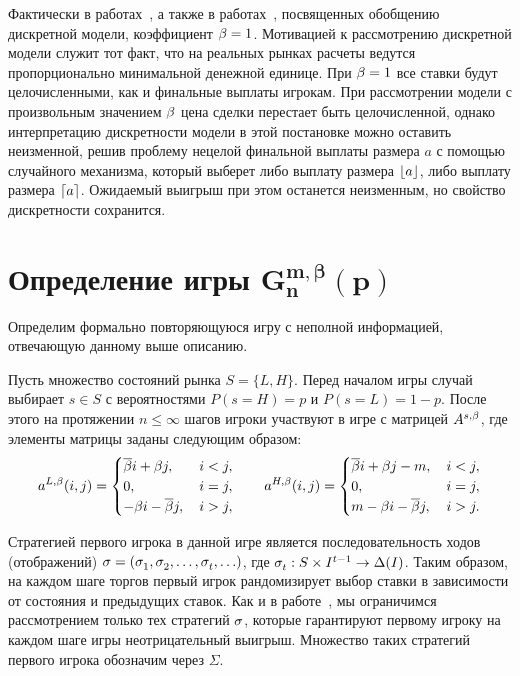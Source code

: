 {Фактически в работах~\cite{domansky07, demeyer05}, а также в работах~\cite{domansky11, domansky13, domansky14}, посвященных обобщению дискретной модели, коэффициент $\beta = 1$.
Мотивацией к рассмотрению дискретной модели служит тот факт, что на реальных рынках расчеты ведутся пропорционально минимальной денежной единице.
При $\beta = 1$ все ставки будут целочисленными, как и финальные выплаты игрокам.
При рассмотрении модели с произвольным значением $\beta$ цена сделки перестает быть целочисленной, однако интерпретацию дискретности модели в этой постановке можно оставить неизменной, решив проблему нецелой финальной выплаты размера $a$ с помощью случайного механизма, который выберет либо выплату размера $\lfloor a \rfloor$, либо выплату размера $\lceil a \rceil$.
Ожидаемый выигрыш при этом останется неизменным, но свойство дискретности сохранится.

\section{Определение игры $\mathbf{G^{m,\beta}_n(p)}$}\label{ch1:formal-def}

Определим формально повторяющуюся игру с неполной информацией, отвечающую данному выше описанию. 

Пусть множество состояний рынка $S = \{L, H\}$. Перед началом игры случай выбирает $s \in S $ с вероятностями $P(s=H) = p$ и $P(s=L) = 1 - p$.
После этого на протяжении $n \leq \infty$ шагов игроки участвуют в игре с матрицей $A^{s,\beta}$, где элементы матрицы заданы следующим образом:
\begin{equation*}
  \as[L](i, j) = \begin{cases}
    \DCo i + \Co j, &\, i < j, \\
    0, &\, i = j, \\
    -\Co i - \DCo j, &\, i > j,
  \end{cases}
  \qquad
  \as[H](i, j) = \begin{cases}
    \DCo i + \Co j - m, &\, i < j, \\
    0, &\, i = j, \\
    m - \Co i - \DCo j, &\, i > j.
  \end{cases}
\end{equation*}

Стратегией первого игрока в данной игре является последовательность ходов (отображений) 
$\sigmar = (\sigmas{1}, \sigmas{2}, \ldots, \sigmas{t}, \ldots)$, где 
$\sigmas{t}: S \times I^{t-1} \rightarrow \Delta(I)$.
Таким образом, на каждом шаге торгов первый игрок рандомизирует выбор ставки в зависимости от состояния и предыдущих ставок.
Как и в работе~\cite{domansky07}, мы ограничимся рассмотрением только тех стратегий $\sigma$, которые гарантируют первому игроку на каждом шаге игры неотрицательный выигрыш.
Множество таких стратегий первого игрока обозначим через $\Sigma$.

}
